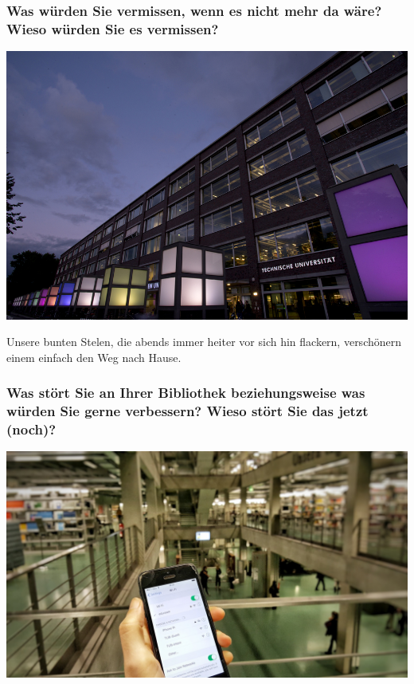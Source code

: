 \hypertarget{was-wuxfcrden-sie-vermissen-wenn-es-nicht-mehr-da-wuxe4re-wieso-wuxfcrden-sie-es-vermissen}{%
\subsubsection*{Was würden Sie vermissen, wenn es nicht mehr da wäre? Wieso
würden Sie es
vermissen?}\label{was-wuxfcrden-sie-vermissen-wenn-es-nicht-mehr-da-wuxe4re-wieso-wuxfcrden-sie-es-vermissen}}

\begin{center}
\includegraphics{tu-berlin/img/stelen.jpg}
\end{center}

Unsere bunten Stelen, die abends immer heiter vor sich hin flackern,
verschönern einem einfach den Weg nach Hause.

\hypertarget{was-stuxf6rt-sie-an-ihrer-bibliothek-beziehungsweise-was-wuxfcrden-sie-gerne-verbessern-wieso-stuxf6rt-sie-das-jetzt-noch}{%
\subsubsection*{Was stört Sie an Ihrer Bibliothek beziehungsweise was würden
Sie gerne verbessern? Wieso stört Sie das jetzt
(noch)?}\label{was-stuxf6rt-sie-an-ihrer-bibliothek-beziehungsweise-was-wuxfcrden-sie-gerne-verbessern-wieso-stuxf6rt-sie-das-jetzt-noch}}

\begin{center}
\includegraphics{tu-berlin/img/wlan.jpeg}
\end{center}

